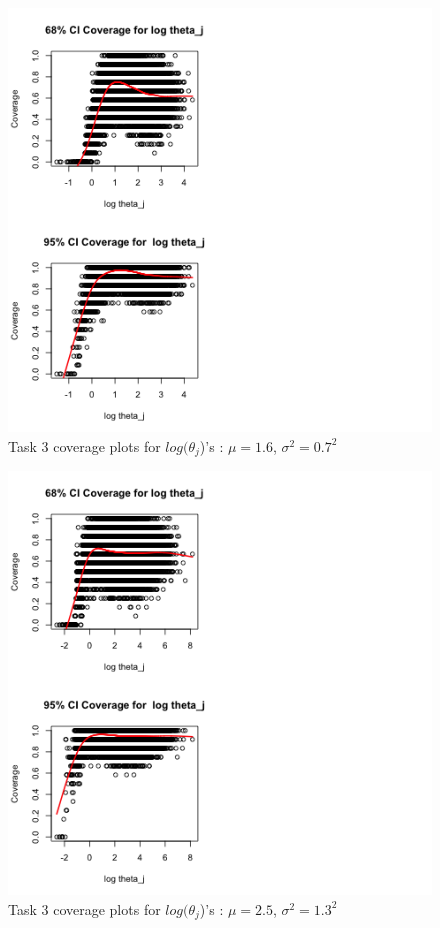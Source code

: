 \documentclass[paper=a4, fontsize=11pt]{scrartcl}
\begin{document}
\begin{figure}[h!]
  \caption{Task 3 coverage plots for $log(\theta_{j}$)'s : $\mu = 1.6$, $\sigma^2 = 0.7^2$}
  \centering
	\includegraphics[scale=1, trim = 0 0 200 0]{keskici_wxiao_ps2_task3_plot1.png}
\end{figure}

\begin{figure}[h!]
  \caption{Task 3 coverage plots for $log(\theta_{j}$)'s : $\mu = 2.5$, $\sigma^2 = 1.3^2$}
  \centering
	\includegraphics[scale=1, trim = 0 0 200 0]{keskici_wxiao_ps2_task3_plot2.png}
\end{figure}
\end{document}
